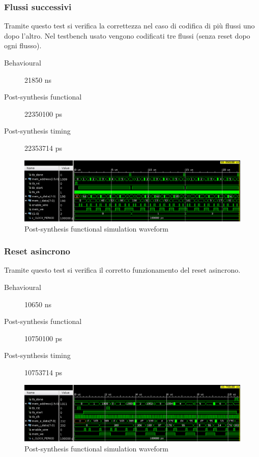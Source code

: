 \documentclass{article}
\begin{document}
\subsubsection{Flussi successivi}
Tramite questo test si verifica la correttezza  nel caso di codifica di più flussi uno dopo l'altro. Nel testbench usato vengono codificati tre flussi (senza reset dopo ogni flusso).
\begin{description}
	\item[Behavioural] 21850 ns
	\item[Post-synthesis functional] 22350100 ps
	\item[Post-synthesis timing] 22353714 ps
\end{description}
\begin{figure}[H]
	\centering
	\includegraphics[width=1\textwidth]{Assets/tb1.png}
	\caption{Post-synthesis functional simulation waveform}
\end{figure}

\subsubsection{Reset asincrono}
Tramite questo test si verifica il corretto funzionamento del reset asincrono.
\begin{description}
	\item[Behavioural] 10650 ns
	\item[Post-synthesis functional] 10750100 ps
	\item[Post-synthesis timing] 10753714 ps
\end{description}
\begin{figure}[!htb]
	\centering
	\includegraphics[width=1\textwidth]{Assets/tb2.png}
	\caption{Post-synthesis functional simulation waveform}
\end{figure}
\end{document}
